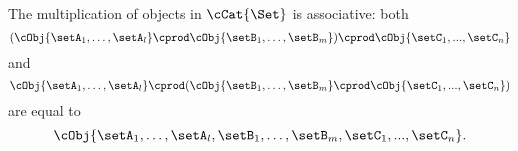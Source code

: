 \begin{remark}
The multiplication of objects in $\cCat{\Set}$ is associative: both 
\begin{equation}
( \cObj{\setA_1, \dots, \setA_l} \cprod \cObj{\setB_1, \dots, \setB_m}) \cprod \cObj{\setC_1, ..., \setC_n}
\end{equation}
and 
\begin{equation}
\cObj{\setA_1, \dots, \setA_l} \cprod (\cObj{\setB_1, \dots, \setB_m} \cprod \cObj{\setC_1, ..., \setC_n})
\end{equation}
are equal to 
\begin{equation}
\cObj{\setA_1, \dots, \setA_l, \setB_1, \dots, \setB_m, \setC_1, ..., \setC_n}.
\end{equation}
\end{remark}

